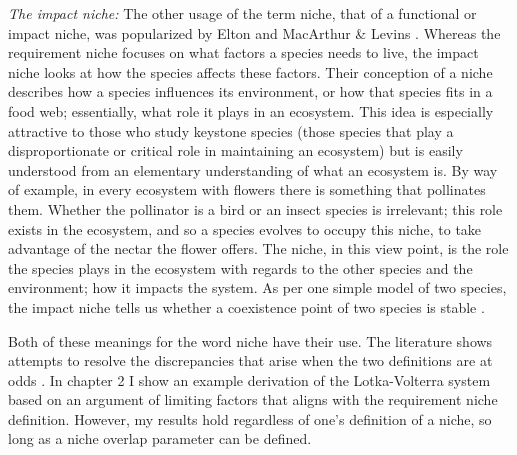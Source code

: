 \emph{The impact niche:}
The other usage of the term niche, that of a functional or impact niche, was popularized by Elton \cite{Elton1927} and MacArthur \& Levins \cite{MacArthur1967}. 
Whereas the requirement niche focuses on what factors a species needs to live, the impact niche looks at how the species affects these factors. 
Their conception of a niche describes how a species influences its environment, or how that species fits in a food web; essentially, what role it plays in an ecosystem. 
This idea is especially attractive to those who study keystone species (those species that play a disproportionate or critical role in maintaining an ecosystem) \cite{May1999,Chesson2000,Leibold2006} but is easily understood from an elementary understanding of what an ecosystem is. 
By way of example, in every ecosystem with flowers there is something that pollinates them. 
Whether the pollinator is a bird or an insect species is irrelevant; this role exists in the ecosystem, and so a species evolves to occupy this niche, to take advantage of the nectar the flower offers. 
The niche, in this view point, is the role the species plays in the ecosystem with regards to the other species and the environment; how it impacts the system. 
As per one simple model of two species, the impact niche tells us whether a coexistence point of two species is stable \cite{Tilman1982textbook}. 

Both of these meanings for the word niche have their use.
The literature shows attempts to resolve the discrepancies that arise when the two definitions are at odds \cite{Leibold1995,Leibold2006}. 
In chapter 2 I show an example derivation of the Lotka-Volterra system based on an argument of limiting factors that aligns with the requirement niche definition. 
However, my results hold regardless of one's definition of a niche, so long as a niche overlap parameter can be defined. 

